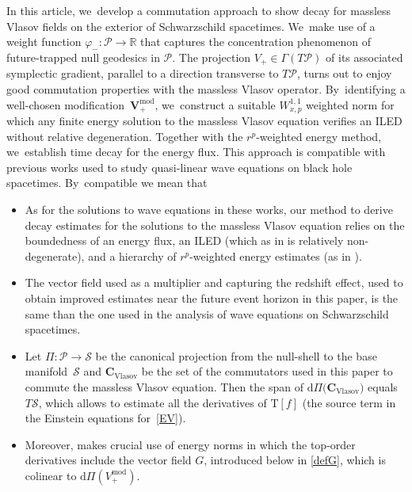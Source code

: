 \documentclass[JEP,XML,SOM,Unicode,published]{cedram}
\theoremstyle{plain}
\theoremstyle{definition}
\newcommand\R{{\mathbb{R}}}
\begin{document}
In this article, we~develop a commutation approach to show decay for massless Vlasov fields on the exterior of Schwarzschild spacetimes. We~make use of a weight function $\varphi_-\colon \mathcal{P}\to \R$ that captures the concentration phenomenon of future-trapped null geodesics in $\mathcal{P}$. The projection $V_+\in \Gamma(T\mathcal{P})$ of its associated symplectic gradient, parallel to a direction transverse to $T\mathcal{P}$, turns out to enjoy good commutation properties with the massless Vlasov operator. By~identifying a well-chosen modification~$\pmb{V}_+^{\mathrm{mod}}$, we~construct a suitable $W_{x,p}^{1,1}$ weighted norm for which any finite energy solution to the massless Vlasov equation verifies an ILED without relative degeneration. Together with the $r^p$-weighted energy method, we~establish time decay for the energy flux. This approach is compatible with previous works \cite{Mavq,DHRTq,DHRTq2} used to study quasi-linear wave equations on black hole spacetimes. By~compatible we mean that
\begin{itemize}
\item As for the solutions to wave equations in these works, our method to derive decay estimates for the solutions to the massless Vlasov equation relies on the boundedness of an energy flux, an ILED (which as in \cite{Mavq} is relatively non-degenerate), and a hierarchy of $r^p$-weighted energy estimates (as in \cite{DHRTq, DHRTq2}).
\item The vector field used as a multiplier and capturing the redshift effect, used to obtain improved estimates near the future event horizon in this paper, is the same than the one used in the analysis of wave equations on Schwarzschild spacetimes.
\item Let $\Pi \colon \mathcal{P} \to \mathcal{S}$ be the canonical projection from the null-shell to the base manifold~$\mathcal{S}$ and $\mathbf{C}_{\mathrm{Vlasov}}$ be the set of the commutators used in this paper to commute the massless Vlasov equation. Then the span of $\mathrm{d} \Pi \bigl( \mathbf{C}_{\mathrm{Vlasov}} \bigr) $ equals $T\mathcal{S}$, which allows to estimate all the derivatives of $\mathrm{T}[f]$ (the source term in the Einstein equations for~\eqref{EV}).
\item Moreover, \cite{Mavq} makes crucial use of energy norms in which the top-order derivatives include the vector field $G$, introduced below in \eqref{defG}, which is colinear to $\mathrm{d} \Pi (V_+^{\mathrm{mod}})$.
\end{itemize}
\end{document}
